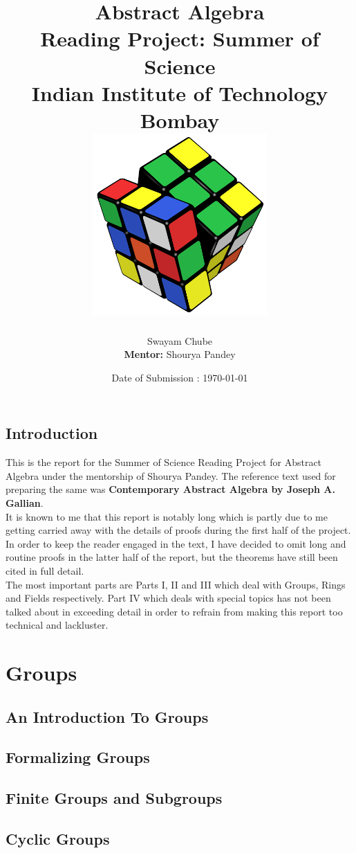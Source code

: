 \documentclass[a4paper, 12pt]{report}
\title{
	{Abstract Algebra}\\
	\small Reading Project: Summer of Science\\
	Indian Institute of Technology Bombay\\
	\includegraphics[width=0.5\textwidth]{../images/grouptheory.png}
}
\author{Swayam Chube\\\textbf{Mentor:} Shourya Pandey}
\date{Date of Submission : \today}
\newcounter{theorem}
\begin{document}
	\maketitle
	\tableofcontents

\chapter*{Introduction}
	This is the report for the Summer of Science Reading Project for Abstract Algebra under the mentorship of Shourya Pandey. The reference text used for preparing the same was \textbf{Contemporary Abstract Algebra by Joseph A. Gallian}. \\
	
	It is known to me that this report is notably long which is partly due to me getting carried away with the details of proofs during the first half of the project. In order to keep the reader engaged in the text, I have decided to omit long and routine proofs in the latter half of the report, but the theorems have still been cited in full detail. \\
	
	The most important parts are Parts I, II and III which deal with Groups, Rings and Fields respectively. Part IV which deals with special topics has not been talked about in exceeding detail in order to refrain from making this report too technical and lackluster.

\part{Groups}
	\chapter{An Introduction To Groups}
	
	
	\chapter{Formalizing Groups}
	
	
	\chapter{Finite Groups and Subgroups}
	
	
	\chapter{Cyclic Groups}
	
	
\end{document}
